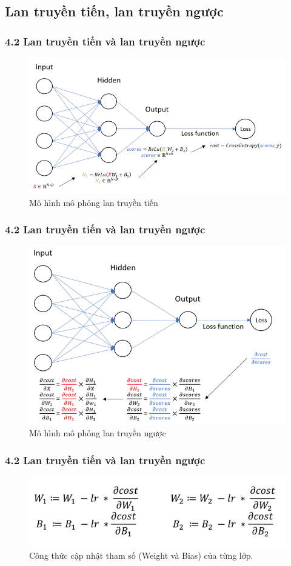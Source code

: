\documentclass{beamer}
\begin{document}
\subsection{Lan truyền tiến, lan truyền ngược} 
\begin{frame}
\frametitle{4.2 Lan truyền tiến và lan truyền ngược}
\begin{figure}
    \centering
    \includegraphics[width=1\linewidth]{images/forward.png}
    \caption{Mô hình mô phỏng lan truyền tiến}
\end{figure}
\end{frame}

\begin{frame}
\frametitle{4.2 Lan truyền tiến và lan truyền ngược}
\begin{figure}
    \centering
    \includegraphics[width=0.8\linewidth]{images/backpro.png}
    \caption{Mô hình mô phỏng lan truyền ngược}
    
\end{figure}
\end{frame}

\begin{frame}
\frametitle{4.2 Lan truyền tiến và lan truyền ngược}
\begin{figure}
    \centering
    \includegraphics[width=1\linewidth]{images/update_w_b.png}
    \caption{Công thức cập nhật tham số (Weight và Bias) của từng lớp.}
    
\end{figure}
\end{frame}
\end{document}
